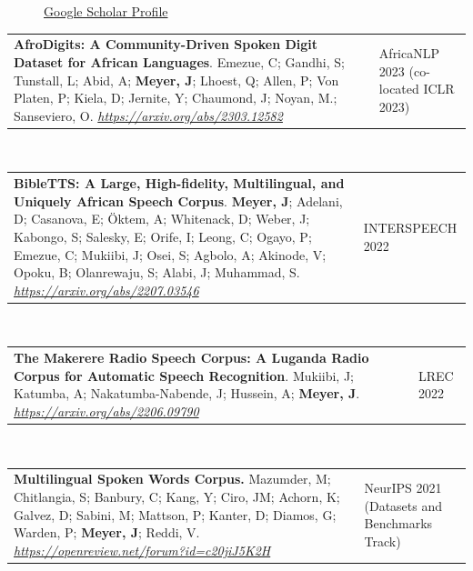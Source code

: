 \documentclass{resume} %
\begin{document}
  \begin{figure}[H]
    \begin{minipage}{\textwidth}
      \centering
      
      
        \href{https://scholar.google.com/citations?user=XiAmdnYAAAAJ}{Google Scholar Profile}
      \end{minipage}
  \end{figure}


\vspace{.25cm}

\begin{tabular}{@{}p{}p{}@{}}
  {\bf AfroDigits: A Community-Driven Spoken Digit Dataset for African Languages}.
  {Emezue, C; Gandhi, S; Tunstall, L; Abid, A; \textbf{Meyer, J}; Lhoest, Q; Allen, P; Von Platen, P; Kiela, D; Jernite, Y; Chaumond, J; Noyan, M.; Sanseviero, O}.
  \emph{\url{https://arxiv.org/abs/2303.12582}}
  & {AfricaNLP 2023 (co-located ICLR 2023)}
\end{tabular}
       \\

\begin{tabular}{@{}p{}p{}@{}}
  {\bf BibleTTS: A Large, High-fidelity, Multilingual, and Uniquely African Speech Corpus}.
  {\textbf{Meyer, J}; Adelani, D; Casanova, E; Öktem, A; Whitenack, D; Weber, J; Kabongo, S; Salesky, E; Orife, I; Leong, C; Ogayo, P; Emezue, C; Mukiibi, J; Osei, S; Agbolo, A; Akinode, V; Opoku, B; Olanrewaju, S; Alabi, J; Muhammad, S}.
  \emph{\url{https://arxiv.org/abs/2207.03546}}
  & {INTERSPEECH 2022}
\end{tabular}
\\
       
\begin{tabular}{@{}p{}p{}@{}}
  {\bf The Makerere Radio Speech Corpus: A Luganda Radio Corpus for Automatic Speech Recognition}.
  {Mukiibi, J; Katumba, A; Nakatumba-Nabende, J; Hussein, A; \textbf{Meyer, J}}.
  \emph{\url{https://arxiv.org/abs/2206.09790}}
  &
  {LREC 2022}
\end{tabular}
\\

\begin{tabular}{@{}p{}p{}@{}}
{\bf Multilingual Spoken Words Corpus.}
{Mazumder, M; Chitlangia, S; Banbury, C; Kang, Y; Ciro, JM; Achorn, K; Galvez, D; Sabini, M; Mattson, P; Kanter, D; Diamos, G; Warden, P; \textbf{Meyer, J}; Reddi, V.}
\emph{\url{https://openreview.net/forum?id=c20jiJ5K2H}}
&
{NeurIPS 2021 (Datasets and Benchmarks Track)}
\end{tabular}
\\
\end{document}
